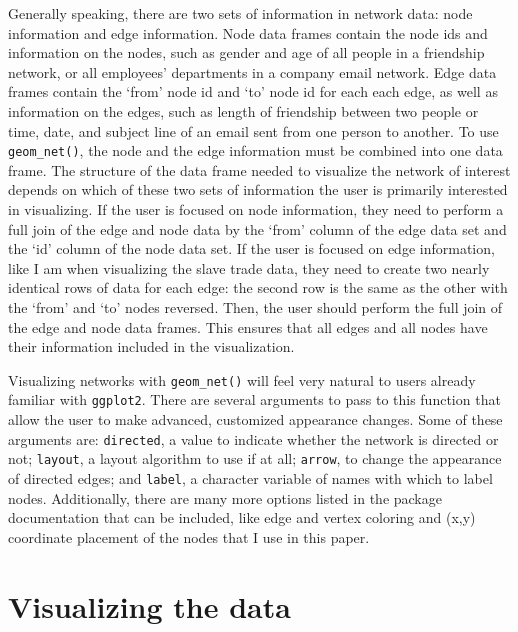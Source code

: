 \documentclass[DIV=calc, paper=a4, fontsize=10pt, twocolumn]{scrartcl}\usepackage[]{graphicx}\usepackage[]{color}
\begin{document}
\par Generally speaking, there are two sets of information in network data: node information and edge information. Node data frames contain the node ids and information on the nodes, such as gender and age of all people in a friendship network, or all employees' departments in a company email network. Edge data frames contain the `from' node id and `to' node id for each each edge, as well as information on the edges, such as length of friendship between two people or time, date, and subject line of an email sent from one person to another. To use \texttt{geom\_net()}, the node and the edge information must be combined into one data frame. The structure of the data frame needed to visualize the network of interest depends on which of these two sets of information the user is primarily interested in visualizing. If the user is focused on node information, they need to perform a full join of the edge and node data by the `from' column of the edge data set and the `id' column of the node data set. If the user is focused on edge information, like I am when visualizing the slave trade data, they need to create two nearly identical rows of data for each edge: the second row is the same as the other with the `from' and `to' nodes reversed. Then, the user should perform the full join of the edge and node data frames. This ensures that all edges and all nodes have their information included in the visualization.   

\par Visualizing networks with \texttt{geom\_net()} will feel very natural to users already familiar with \texttt{ggplot2}. There are several arguments to pass to this function that allow the user to make advanced, customized appearance changes. Some of these arguments are: \texttt{directed}, a value to indicate whether the network is directed or not; \texttt{layout}, a layout algorithm to use if at all; \texttt{arrow}, to change the appearance of directed edges; and \texttt{label}, a character variable of names with which to label nodes. Additionally, there are many more options listed in the package documentation that can be included, like edge and vertex coloring and (x,y) coordinate placement of the nodes that I use in this paper. 





\section*{Visualizing the data}  
\end{document}
